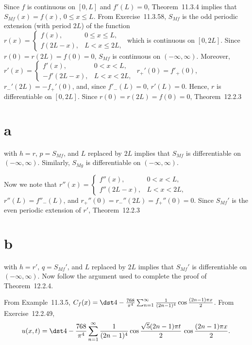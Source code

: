 \documentclass[dvips]{book}
\renewcommand{\exer}[1]{\par\medskip\;\noindent{\color{red}\bf #1.}}
\numberwithin{example}{section}
\numberwithin{equation}{section}
\numberwithin{theorem}{section}
\numberwithin{table}{section}
\numberwithin{figure}{section}
\begin{document}
\exer{12.2.48}
Since $f$ is continuous on $[0,L]$ and $f'(L)=0$,
Theorem~11.3.4 implies that $S_{M\!f}(x)=f(x)$, $0\le x\le L$. From
 Exercise~11.3.58,
 $S_{M\!f}$  is the odd periodic
extension (with period $2L$) of the function
$r(x)=
\left\{\begin{array}{cl}
f(x),&0\le x\le L,\\f(2L-x),&L< x\le 2L,
\end{array}\right.$
which is continuous on $[0,2L]$.
Since $r(0)=r(2L)=f(0)=0$, $S_{M\!f}$  is continuous on
$(-\infty,\infty)$. Moreover,
$r'(x)=
\left\{\begin{array}{cl}
f'(x),&0< x< L,\\-f'(2L-x),&L< x< 2L,
\end{array}\right.$
 $r_+'(0)=f'_+(0)$, $r_-'(2L)=-f_+'(0)$, and, since $f'_-(L)=0$,
$r'(L)=0$. Hence, $r$ is differentiable on $[0,2L]$. Since
$r(0)=r(2L)=f(0)=0$,
 Theorem~12.2.3\part{a} with $h=r$, $p=S_{M\!f}$,
and
$L$ replaced by $2L$  implies that $S_{M\!f}$  is differentiable
on $(-\infty,\infty)$. Similarly, $S_{M\!g}$ is differentiable
on $(-\infty,\infty)$.

Now we note that
$r''(x)=
\left\{\begin{array}{cl}
f''(x),&0< x< L,\\f''(2L-x),&L< x< 2L,
\end{array}\right.$
$r''(L)=f''_-(L)$, and   $r_+''(0)=
r_-''(2L)=f_+''(0)=0$.
 Since $S_{M\!f}'$ is the even periodic
extension of $r'$, Theorem~12.2.3\part{b} with $h=r'$,
$q=S_{M\!f}'$,  and
$L$ replaced by $2L$ implies that  $S_{M\!f}'$  is differentiable
on $(-\infty,\infty)$.  Now follow the argument used to complete the
proof of Theorem~12.2.4.

\exer{12.2.50}
From Example~11.3.5,
$C_f(x)=\dst4-{768\over\pi^4}\sum_{n=1}^\infty{1\over
(2n-1)^4}\cos{(2n-1)\pi x\over 2}$.
From Exercise~12.2.49,
$$
u(x,t)=\dst4-{768\over\pi^4}\sum_{n=1}^\infty{1\over
(2n-1)^4}\cos{\sqrt5(2n-1)\pi t\over2}\,\cos{(2n-1)\pi x\over 2}.
$$
\end{document}
